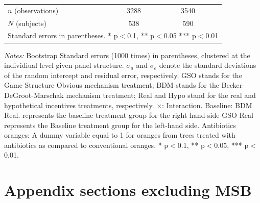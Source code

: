 \documentclass[12pt]{article}
\begin{document}
\begin{table}[H]
{\begin{tabular}{l*{2}{cc}}
\hline
\(n\) (observations)    &        3288         &            &        3540         &            \\
\(N\) (subjects)      &        538         &            &        590         &            \\
\hline \hline
\multicolumn{5}{l}{\footnotesize Standard errors in parentheses. * p$<$0.1, ** p$<$0.05 *** p$<$0.01}\\
\end{tabular}
}

\begin{tablenotes}
            \footnotesize
           \item \textit{Notes:} Bootstrap Standard errors (1000 times) in parentheses, clustered at the individiual level given panel structure. $\sigma_u$ and $\sigma_e$ denote the standard deviations of the random intercept and residual error, respectively. GSO stands for the Game Structure Obvious mechanism treatment; BDM stands for the Becker-DeGroot-Marschak mechanism treatment; Real and Hypo stand for the real and hypothetical incentives treatments, respectively. $\times$: Interaction. Baseline: BDM Real. represents the baseline treatment group for the right hand-side GSO Real represents the Baseline treatment group for the left-hand side. Antibiotics oranges: A dummy variable equal to 1 for oranges from trees treated with antibiotics as compared to conventional oranges. * p$<$0.1, ** p$<$0.05, *** p$<$0.01.
        \end{tablenotes}
\end{table}





\clearpage
\section{Appendix sections excluding MSB}
\end{document}
